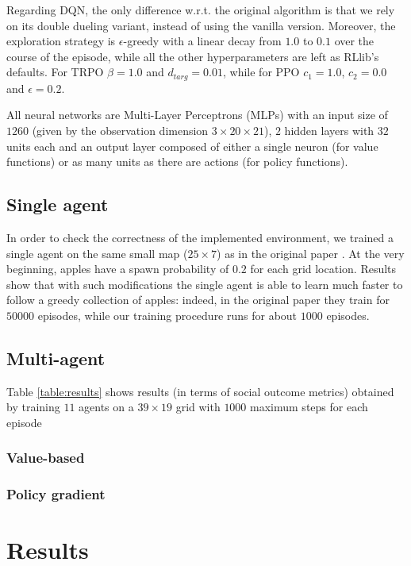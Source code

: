\documentclass{article}
\begin{document}
Regarding DQN, the only difference w.r.t. the original algorithm is that we rely on its double dueling variant, instead of using the vanilla version. Moreover, the exploration strategy is $\epsilon$-greedy with a linear decay from $1.0$ to $0.1$ over the course of the episode, while all the other hyperparameters are left as RLlib's defaults. For TRPO $\beta=1.0$ and $d_{targ}=0.01$, while for PPO $c_1=1.0$, $c_2=0.0$ and $\epsilon=0.2$.

All neural networks are Multi-Layer Perceptrons (MLPs) with an input size of $1260$ (given by the observation dimension $3\times20\times21$), $2$ hidden layers with $32$ units each and an output layer composed of either a single neuron (for value functions) or as many units as there are actions (for policy functions).

\subsection{Single agent}
In order to check the correctness of the implemented environment, we trained a single agent on the same small map ($25\times7$) as in the original paper \cite{harvest}. At the very beginning, apples have a spawn probability of $0.2$ for each grid location. Results show that with such modifications the single agent is able to learn much faster to follow a greedy collection of apples: indeed, in the original paper they train for $50000$ episodes, while our training procedure runs for about $1000$ episodes.

\subsection{Multi-agent}

Table \ref{table:results} shows results (in terms of social outcome metrics) obtained by training $11$ agents on a $39\times19$ grid with $1000$ maximum steps for each episode

\subsubsection{Value-based}


\subsubsection{Policy gradient}

\section{Results}
\end{document}
